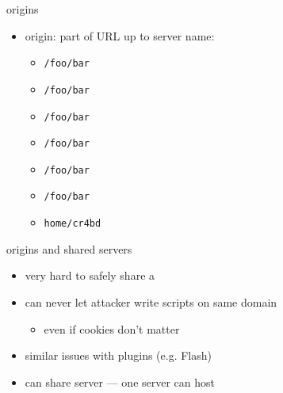 \begin{frame}{origins}
    \begin{itemize}
        \item origin: part of URL up to server name:
            \begin{itemize}
                \item \texttt{/foo/bar}
                \item \texttt{/foo/bar}
                \item \texttt{/foo/bar}
                \item \texttt{/foo/bar}
                \item \texttt{/foo/bar}
                \item \texttt{/foo/bar}
                \item \texttt{home/cr4bd}
            \end{itemize}
    \end{itemize}
\end{frame}


\begin{frame}{origins and shared servers}
    \begin{itemize}
        \item very hard to safely share a 
    \item can never let attacker write scripts on same domain
        \begin{itemize}
        \item even if cookies don't matter
        \end{itemize}
    \item similar issues with plugins (e.g. Flash)
    \vspace{.5cm}
\item can share server --- one server can host 
    \end{itemize}
\end{frame}
